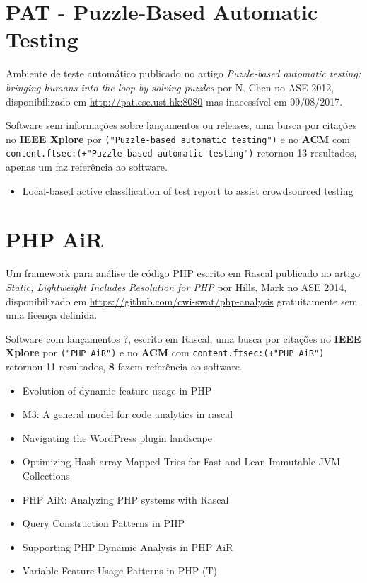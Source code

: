 \section{PAT - Puzzle-Based Automatic Testing}

Ambiente de teste automático
publicado no artigo {\it Puzzle-based automatic testing: bringing humans into the loop by solving puzzles}
por N. Chen
no ASE 2012,
disponibilizado em \url{http://pat.cse.ust.hk:8080}
mas inacessível em 09/08/2017.

Software sem informações sobre lançamentos ou releases,
uma busca por citações no {\bf IEEE Xplore} por
\texttt{("Puzzle-based automatic testing")}
e no {\bf ACM} com
\texttt{content.ftsec:(+"Puzzle-based automatic testing")}
retornou
13 resultados,
apenas um faz referência ao software.

\begin{itemize}
\item Local-based active classification of test report to assist crowdsourced testing
\end{itemize}


\section{PHP AiR}

Um framework para análise de código PHP escrito em Rascal
publicado no artigo {\it Static, Lightweight Includes Resolution for PHP}
por Hills, Mark
no ASE 2014,
disponibilizado em \url{https://github.com/cwi-swat/php-analysis}
gratuitamente
sem uma licença definida.

Software com lançamentos ?,
escrito em Rascal,
uma busca por citações no {\bf IEEE Xplore} por
\texttt{("PHP AiR")}
e no {\bf ACM} com
\texttt{content.ftsec:(+"PHP AiR")}
retornou
11 resultados,
{\bf 8} fazem referência ao software.

\begin{itemize}
\item Evolution of dynamic feature usage in PHP
\item M3: A general model for code analytics in rascal
\item Navigating the WordPress plugin landscape
\item Optimizing Hash-array Mapped Tries for Fast and Lean Immutable JVM Collections
\item PHP AiR: Analyzing PHP systems with Rascal
\item Query Construction Patterns in PHP
\item Supporting PHP Dynamic Analysis in PHP AiR
\item Variable Feature Usage Patterns in PHP (T)
\end{itemize}



